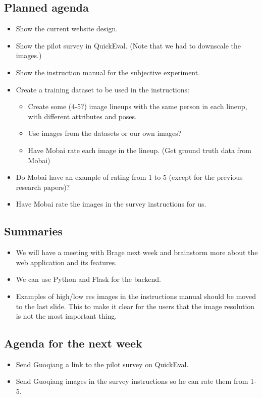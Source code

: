 \subsection*{Planned agenda}
\begin{itemize}
    \item Show the current website design.
    \item Show the pilot survey in QuickEval. (Note that we had to downscale the images.)
    \item Show the instruction manual for the subjective experiment.
    \item Create a training dataset to be used in the instructions:
    \begin{itemize}
        \item Create some (4-5?) image lineups with the same person in each lineup, with different attributes and poses.
        \item Use images  from the datasets or our own images?
        \item Have Mobai rate each image in the lineup. (Get ground truth data from Mobai)
    \end{itemize}
    \item Do Mobai have an example of rating from 1 to 5 (except for the previous research papers)?
    \item Have Mobai rate the images in the survey instructions for us.
\end{itemize}

\subsection*{Summaries}
\begin{itemize}
    \item We will have a meeting with Brage next week and brainstorm more about the web application and its features.
    \item We can use Python and Flask for the backend.
    \item Examples of high/low res images in the instructions manual should be moved to the last slide. This to make it clear for the users that the image resolution is not the most important thing.
\end{itemize}

\subsection*{Agenda for the next week}
\begin{itemize}
    \item Send Guoqiang a link to the pilot survey on QuickEval.
    \item Send Guoqiang images in the survey instructions so he can rate them from 1-5.
\end{itemize}

